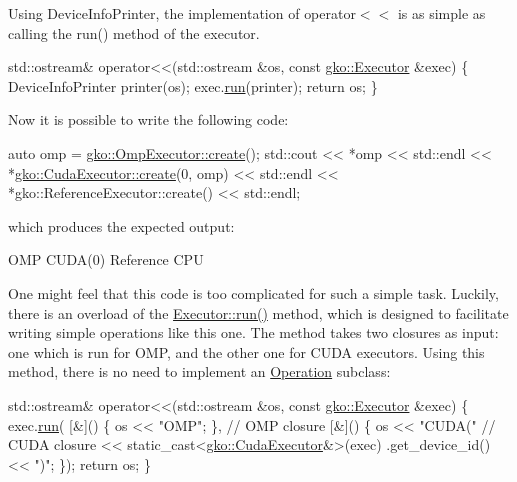 Using Device\+Info\+Printer, the implementation of {\ttfamily operator$<$$<$} is as simple as calling the run() method of the executor.


\begin{DoxyCode}
std::ostream& operator<<(std::ostream &os, \textcolor{keyword}{const} \hyperlink{classgko_1_1Executor}{gko::Executor} &exec)
\{
    DeviceInfoPrinter printer(os);
    exec.\hyperlink{classgko_1_1Executor_a1de8e2668b76e66690acf5eef9e8324d}{run}(printer);
    \textcolor{keywordflow}{return} os;
\}
\end{DoxyCode}


Now it is possible to write the following code\+:


\begin{DoxyCode}
\textcolor{keyword}{auto} omp = \hyperlink{classgko_1_1OmpExecutor_a33ca05fdd0fc928ee262fc9425304874}{gko::OmpExecutor::create}();
std::cout << *omp << std::endl
          << *\hyperlink{classgko_1_1CudaExecutor_a2718a92034350650ef406ffdb60db090}{gko::CudaExecutor::create}(0, omp) << std::endl
          << *gko::ReferenceExecutor::create() << std::endl;
\end{DoxyCode}


which produces the expected output\+:


\begin{DoxyCode}
OMP
CUDA(0)
Reference CPU
\end{DoxyCode}


One might feel that this code is too complicated for such a simple task. Luckily, there is an overload of the \hyperlink{classgko_1_1Executor_a1de8e2668b76e66690acf5eef9e8324d}{Executor\+::run()} method, which is designed to facilitate writing simple operations like this one. The method takes two closures as input\+: one which is run for O\+MP, and the other one for C\+U\+DA executors. Using this method, there is no need to implement an \hyperlink{classgko_1_1Operation}{Operation} subclass\+:


\begin{DoxyCode}
std::ostream& operator<<(std::ostream &os, \textcolor{keyword}{const} \hyperlink{classgko_1_1Executor}{gko::Executor} &exec)
\{
    exec.\hyperlink{classgko_1_1Executor_a1de8e2668b76e66690acf5eef9e8324d}{run}(
        [&]() \{ os << \textcolor{stringliteral}{"OMP"}; \},  \textcolor{comment}{// OMP closure}
        [&]() \{ os << \textcolor{stringliteral}{"CUDA("}    \textcolor{comment}{// CUDA closure}
                   << \textcolor{keyword}{static\_cast<}\hyperlink{classgko_1_1CudaExecutor}{gko::CudaExecutor}&\textcolor{keyword}{>}(exec)
                        .get\_device\_id()
                   << \textcolor{stringliteral}{")"}; \});
    \textcolor{keywordflow}{return} os;
\}
\end{DoxyCode}


